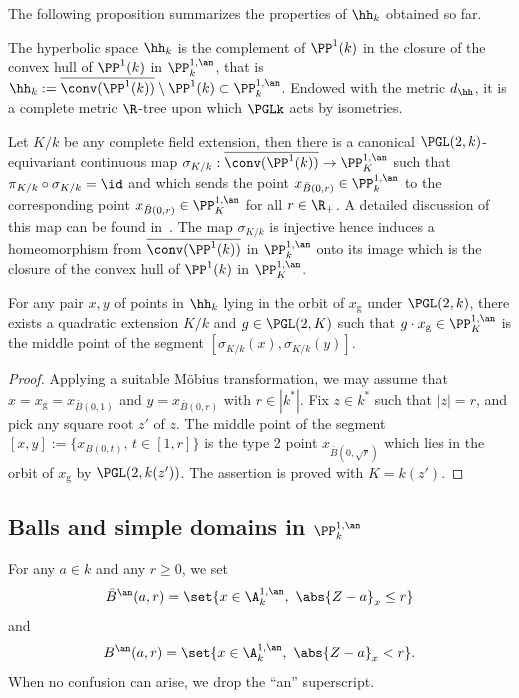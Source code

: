 The following proposition summarizes the properties of $\hh_k$ obtained so far.

\begin{prop}
The hyperbolic space $\hh_k$ is the complement of $\PP^1(k)$ in the closure of the convex hull of $\PP^1(k)$ in $\PP^{1,\an}_{k}$, that is $\hh_k:= \overline{\conv(\PP^1(k))}\setminus \PP^1(k)\subset \PP^{1,\an}_k$. Endowed with the metric $d_\hh$, it is a complete metric $\R$-tree upon which $\PGLk$ acts by isometries.
\end{prop}

Let $K/k$ be any complete field extension, then there is a canonical $\PGL(2,k)$-equivariant continuous map $\sigma_{K/k} : \overline{\conv(\PP^1(k))} \to \PP^{1,\an}_K$ such that $\pi_{K/k} \circ \sigma_{K/k} = \id$ and which sends the point $x_{\bar{B}(0,r)}\in\PP^{1,\an}_k$ to the corresponding point $x_{\bar{B}(0,r)}\in \PP^{1,\an}_K$ for all $r\in \R_+$. A detailed discussion of this map can be found in~\cite{poineau}. The map $\sigma_{K/k}$ is injective hence induces a homeomorphism from $\overline{\conv(\PP^1(k))}$ in $ \PP^{1,\an}_k$ onto its image which is the closure of the convex hull of $ \PP^1(k)$ in $ \PP^{1,\an}_K$.

\begin{prop}\label{prop:quadratic}
For any pair $x, y$ of points in $ \hh_k$ lying in the orbit of $x_{\mathrm{g}}$ under $\PGL(2,k)$, there exists a quadratic extension $K/k$ and $g\in \PGL(2,K)$ such that $g\cdot x_{\mathrm{g}}\in \PP^{1,\an}_K$ is the middle point of the segment $[\sigma_{K/k}(x),\sigma_{K/k}(y)]$.
\end{prop}

\begin{proof}
Applying a suitable M\"obius transformation, we may assume that $x= x_{\mathrm{g}} =x_{\bar{B}(0,1)}$ and $y = x_{\bar{B}(0,r)}$ with $r\in |k^*|$. Fix $z\in k^*$ such that $|z| = r$, and pick any square root $z'$ of $z$. The middle point of the segment $[x,y]:= \{x_{B(0,t)}, \, t \in [1,r]\}$ is the type 2 point $x_{\bar B(0, \sqrt{r})}$ which lies in the orbit of $x_{\mathrm{g}}$ by $\PGL(2,k(z'))$. The assertion is proved with $K=k(z')$.
\end{proof}

\subsection{Balls and simple domains in \texorpdfstring{$\PP^{1, \an}_k$}{PP1, ank}}

For any $a\in k$ and any $r\geq 0$, we set
\begin{equation}\label{eq:ball1}
\bar{B}^\an(a, r) = \set{x\in \A^{1, \an}_k, \ \abs{Z-a}_x \leq r}
\end{equation}
and
\begin{equation}\label{eq:ball2}
B^\an(a, r) = \set{x\in \A^{1, \an}_k, \ \abs{Z-a}_x < r}.
\end{equation}
When no confusion can arise, we drop the ``an'' superscript.

